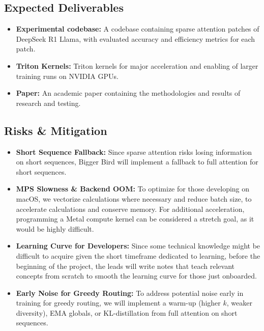 \documentclass{article}
\begin{document}
\subsection{Expected Deliverables}
\begin{itemize}
    \item \textbf{Experimental codebase:} A codebase containing sparse attention patches of DeepSeek R1 Llama, with evaluated accuracy and efficiency metrics for each patch.
    \item \textbf{Triton Kernels:} Triton kernels for major acceleration and enabling of larger training runs on NVIDIA GPUs.
    \item \textbf{Paper:} An academic paper containing the methodologies and results of research and testing.
\end{itemize}

\subsection{Risks \& Mitigation} %

\begin{itemize}
    \item \textbf{Short Sequence Fallback:} Since sparse attention risks losing information on short sequences, Bigger Bird will implement a fallback to full attention for short sequences.
    \item \textbf{MPS Slowness \& Backend OOM:} To optimize for those developing on macOS, we vectorize calculations where necessary and reduce batch size, to accelerate calculations and conserve memory. For additional acceleration, programming a Metal compute kernel can be considered a stretch goal, as it would be highly difficult.
    \item \textbf{Learning Curve for Developers:} Since some technical knowledge might be difficult to acquire given the short timeframe dedicated to learning, before the beginning of the project, the leads will write notes that teach relevant concepts from scratch to smooth the learning curve for those just onboarded. \cite{notes}
    \item \textbf{Early Noise for Greedy Routing:} To address potential noise early in training for greedy routing, we will implement a warm-up (higher \(k\), weaker diversity), EMA globals, or KL-distillation from full attention on short sequences.
\end{itemize}
\end{document}
